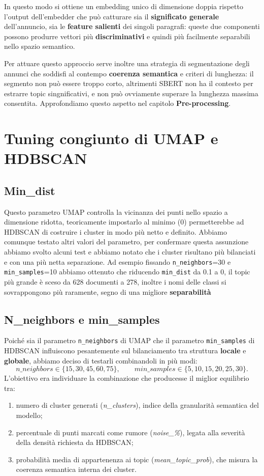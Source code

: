 In questo modo si ottiene un embedding unico di dimensione doppia rispetto l'output dell'embedder che può catturare sia il \textbf{significato generale} dell'annuncio, sia le \textbf{feature salienti} dei singoli paragrafi: queste due componenti possono produrre vettori più \textbf{discriminativi} e quindi più facilmente separabili nello spazio semantico.

Per attuare questo approccio serve inoltre una strategia di segmentazione degli annunci che soddisfi al contempo \textbf{coerenza semantica} e criteri di lunghezza: il segmento non può essere troppo corto, altrimenti SBERT non ha il contesto per estrarre topic singnificativi, e non può ovviamente superare la lunghezza massima consentita. Approfondiamo questo aspetto nel capitolo \textbf{Pre-processing}.

\section{Tuning congiunto di UMAP e HDBSCAN}
\subsection{Min\_dist}
Questo parametro UMAP controlla la vicinanza dei punti nello spazio a dimensione ridotta, teoricamente impostarlo al minimo (0) permetterebbe ad HDBSCAN di costruire i cluster in modo più netto e definito. Abbiamo comunque testato altri valori del parametro, per confermare questa assunzione abbiamo svolto alcuni test e abbiamo notato che i cluster risultano più bilanciati e con una più netta separazione.
Ad esempio fissando \texttt{n\_neighbors}=30 e \texttt{min\_samples}=10 abbiamo ottenuto che riducendo \texttt{min\_dist} da 0.1 a 0, il topic più grande è sceso da 628 documenti a 278, inoltre i nomi delle classi si sovrappongono più raramente, segno di una migliore \textbf{separabilità}
\subsection{N\_neighbors e min\_samples}
Poiché sia il parametro \texttt{n\_neighbors} di UMAP che il parametro \texttt{min\_samples} di HDBSCAN influiscono pesantemente sul bilanciamento tra struttura \textbf{locale} e \textbf{globale}, abbiamo deciso di testarli combinandoli in più modi:
\[
n\_neighbors \in \{15, 30, 45, 60, 75\}, \qquad
min\_samples \in \{5, 10, 15, 20, 25, 30\}.
\]
L'obiettivo era individuare la combinazione che producesse il miglior equilibrio tra:
\begin{enumerate}
    \item numero di cluster generati (\emph{n\_clusters}), indice della granularità semantica del modello;
    \item percentuale di punti marcati come rumore (\emph{noise\_\%}), legata alla severità della densità richiesta da HDBSCAN;
    \item probabilità media di appartenenza ai topic (\emph{mean\_topic\_prob}), che misura la coerenza semantica interna dei cluster.
\end{enumerate}

